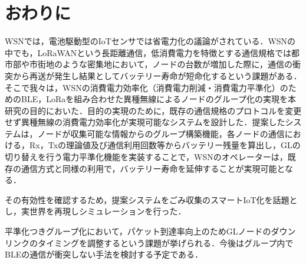 \documentclass[Japanese]{dicomopapers}
\begin{document}
\section{おわりに}
WSNでは，電池駆動型のIoTセンサでは省電力化の議論がされている．WSNの中でも，LoRaWANという長距離通信，低消費電力を特徴とする通信規格では都市部や市街地のような密集地において，ノードの台数が増加した際に，通信の衝突から再送が発生し結果としてバッテリー寿命が短命化するという課題がある．そこで我々は，WSNの消費電力効率化（消費電力削減・消費電力平準化）のためのBLE，LoRaを組み合わせた異種無線によるノードのグループ化の実現を本研究の目的においた．目的の実現のために，既存の通信規格のプロトコルを変更せず異種無線の消費電力効率化が実現可能なシステムを設計した．提案したシステムは，ノードが収集可能な情報からのグループ構築機能，各ノードの通信における，Rx，Txの理論値及び通信利用回数等からバッテリー残量を算出し，GLの切り替えを行う電力平準化機能を実装することで，WSNのオペレーターは，既存の通信方式と同様の利用で，バッテリー寿命を延伸することが実現可能となる．
\par
その有効性を確認するため，提案システムをごみ収集のスマートIoT化を話題とし，実世界を再現しシミュレーションを行った．
\par
平準化つきグループ化において，パケット到達率向上のためGLノードのダウンリンクのタイミングを調整するという課題が挙げられる．今後はグループ内でBLEの通信が衝突しない手法を検討する予定である．
\end{document}
